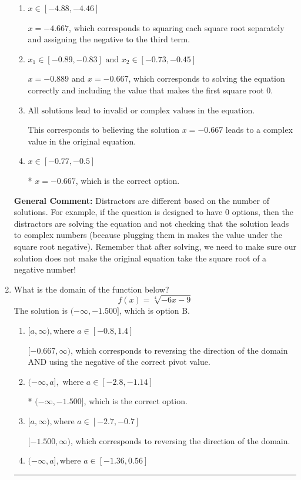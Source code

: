 \documentclass{extbook}[14pt]
\newcommand{\litem}[1]{\item #1

\rule{\textwidth}{0.4pt}}
\begin{document}
\begin{enumerate}
{\begin{enumerate}[label=\Alph*.]
$x = -1.000$ and $x = -0.889$, which corresponds to solving each radical separately for 0.
\item \( x \in [-4.88,-4.46] \)

$x = -4.667$, which corresponds to squaring each square root separately and assigning the negative to the third term.
\item \( x_1 \in [-0.89, -0.83] \text{ and } x_2 \in [-0.73,-0.45] \)

$x = -0.889$ and $x = -0.667$, which corresponds to solving the equation correctly and including the value that makes the first square root 0.
\item \( \text{All solutions lead to invalid or complex values in the equation.} \)

This corresponds to believing the solution $x = -0.667$ leads to a complex value in the original equation.
\item \( x \in [-0.77,-0.5] \)

* $x = -0.667$, which is the correct option.
\end{enumerate}

\textbf{General Comment:} Distractors are different based on the number of solutions. For example, if the question is designed to have 0 options, then the distractors are solving the equation and not checking that the solution leads to complex numbers (because plugging them in makes the value under the square root negative). Remember that after solving, we need to make sure our solution does not make the original equation take the square root of a negative number!
}
\litem{
What is the domain of the function below?
\[ f(x) = \sqrt[4]{-6 x - 9} \]The solution is \( (-\infty, -1.500] \), which is option B.\begin{enumerate}[label=\Alph*.]
\item \( [a, \infty), \text{where } a \in [-0.8, 1.4] \)

$[-0.667, \infty)$, which corresponds to reversing the direction of the domain AND using the negative of the correct pivot value.
\item \( (-\infty, a], \text{ where } a \in [-2.8, -1.14] \)

* $(-\infty, -1.500]$, which is the correct option.
\item \( [a, \infty), \text{where } a \in [-2.7, -0.7] \)

 $[-1.500, \infty)$, which corresponds to reversing the direction of the domain.
\item \( (-\infty, a], \text{where } a \in [-1.36, 0.56] \)


\end{enumerate}}
\end{enumerate}
\end{document}
